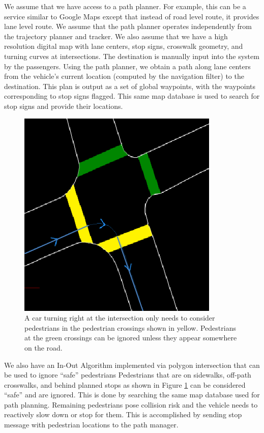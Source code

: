 \documentclass[letterpaper, 10 pt, conference]{ieeeconf}  %
\begin{document}
We assume that we have access to a path planner.
For example, this can be a service similar to Google Maps except that instead of road level route, it provides lane level route. 
We assume that the path planner operates independently from the trajectory planner and tracker.
We also assume that we have a high resolution digital map with lane centers, stop signs, crosswalk geometry, and turning curves at intersections.
The destination is manually input into the system by the passengers.
Using the path planner, we obtain a path along lane centers from the vehicle's current location (computed by the navigation filter) to the destination.
This plan is output as a set of global waypoints, with the waypoints corresponding to stop signs flagged.
This same map database is used to search for stop signs and provide their locations.


\begin{figure}[thpb]
  \centering
  \includegraphics[width=0.3\columnwidth]{graphics/IntersectionCrosswalks.png}
  \caption{
    A car turning right at the intersection only needs to consider pedestrians in the pedestrian crossings shown in yellow.
    Pedestrians at the green crossings can be ignored unless they appear somewhere on the road.
  }
  \label{fig:intersect}
\end{figure}

We also have an In-Out Algorithm implemented via polygon intersection that can be used to ignore “safe” pedestrians
Pedestrians that are on sidewalks, off-path crosswalks, and behind planned stops as shown in Figure \ref{fig:intersect} can be considered ``safe'' and are ignored.
This is done by searching the same map database used for path planning.
Remaining pedestrians pose collision risk and the vehicle needs to reactively slow down or stop for them.
This is accomplished by sending stop message with pedestrian locations to the path manager.
\end{document}

